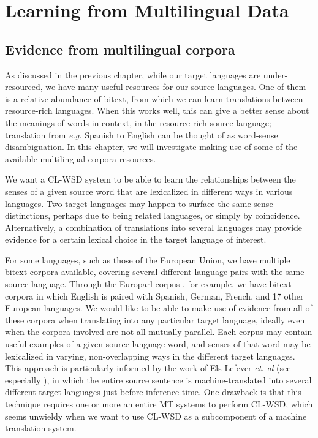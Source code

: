 \chapter{Learning from Multilingual Data}
\label{chap:multilingual}

\section{Evidence from multilingual corpora}
As discussed in the previous chapter, while our target languages are
under-resourced, we have many useful resources for our source languages. One of
them is a relative abundance of bitext, from which we can learn translations
between resource-rich languages. When this works well, this can give a better
sense about the meanings of words in context, in the resource-rich source
language; translation from \emph{e.g.} Spanish to English can be thought of as
word-sense disambiguation. In this chapter, we will investigate making use of
some of the available multilingual corpora resources.

We want a CL-WSD system to be able to learn the relationships between the
senses of a given source word that are lexicalized in different ways in various
languages.
Two target languages may happen to surface the same sense distinctions, perhaps
due to being related languages, or simply by coincidence.
Alternatively, a combination of translations into several languages may provide
evidence for a certain lexical choice in the target language of interest.

For some languages, such as those of the European Union, we have multiple
bitext corpora available, covering several different language pairs with the
same source language. Through the Europarl corpus \cite{europarl}, for example,
we have bitext corpora in which English is paired with Spanish, German, French,
and 17 other European languages.
We would like to be able to make use of evidence from all of these corpora when
translating into any particular target language, ideally even when the corpora
involved are not all mutually parallel.
Each corpus may contain useful examples of a given source language word,
and senses of that word may be lexicalized in varying, non-overlapping ways in
the different target languages.
This approach is particularly informed by the work of Els Lefever
\emph{et. al} (see especially \cite{lefever-hoste-decock:2011:ACL-HLT2011}), in
which the entire source sentence is machine-translated into several different
target languages just before inference time. One drawback is that this
technique requires one or more an entire MT systems to perform CL-WSD, which
seems unwieldy when we want to use CL-WSD as a subcomponent of a machine
translation system.

